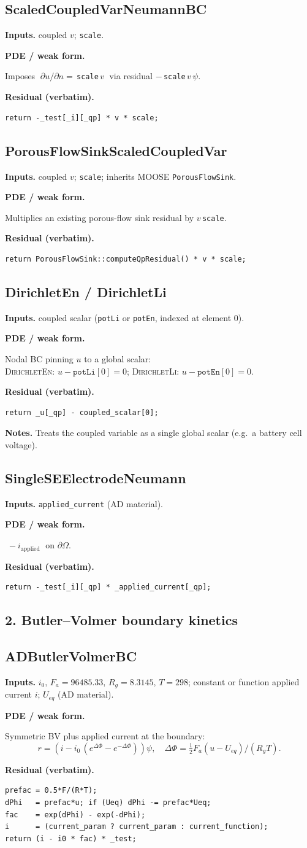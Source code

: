 \documentclass[11pt]{article}
\newcommand{\F}{F_{\!a}}            %
\newcommand{\Rg}{R_{\!g}}           %
\newenvironment{ecmEntry}[1]{%
  \subsection{#1}%
}{}
\newcommand{\inputsRow}[1]{\par\noindent\textbf{Inputs.} #1\par}
\newcommand{\pdeRow}[1]{\par\noindent\textbf{PDE / weak form.}\par #1\par}
\newcommand{\codeRow}{\par\noindent\textbf{Residual (verbatim).}\par}
\newcommand{\notesRow}[1]{\par\noindent\textbf{Notes.} #1\par}
\begin{document}
\begin{ecmEntry}{ScaledCoupledVarNeumannBC}
\inputsRow{coupled $v$; \texttt{scale}.}
\pdeRow{Imposes $\;\partial u/\partial n = $\,\texttt{scale}$\,v\;$ via residual
$-$\,\texttt{scale}$\,v\,\psi$.}
\codeRow\begin{lstlisting}
return -_test[_i][_qp] * v * scale;
\end{lstlisting}
\end{ecmEntry}

\begin{ecmEntry}{PorousFlowSinkScaledCoupledVar}
\inputsRow{coupled $v$; \texttt{scale}; inherits MOOSE \texttt{PorousFlowSink}.}
\pdeRow{Multiplies an existing porous-flow sink residual by $v\,$\texttt{scale}.}
\codeRow\begin{lstlisting}
return PorousFlowSink::computeQpResidual() * v * scale;
\end{lstlisting}
\end{ecmEntry}

\begin{ecmEntry}{DirichletEn / DirichletLi}
\inputsRow{coupled scalar (\texttt{potLi} or \texttt{potEn}, indexed at element 0).}
\pdeRow{Nodal BC pinning $u$ to a global scalar:\\
\textsc{DirichletEn}: $u - \texttt{potLi}[0]=0$;\quad
\textsc{DirichletLi}: $u - \texttt{potEn}[0]=0$.}
\codeRow\begin{lstlisting}
return _u[_qp] - coupled_scalar[0];
\end{lstlisting}
\notesRow{Treats the coupled variable as a single global scalar (e.g.\ a battery cell
voltage).}
\end{ecmEntry}

\begin{ecmEntry}{SingleSEElectrodeNeumann}
\inputsRow{\texttt{applied\_current} (AD material).}
\pdeRow{$\;-i_{\text{applied}}\;$ on $\partial\Omega$.}
\codeRow\begin{lstlisting}
return -_test[_i][_qp] * _applied_current[_qp];
\end{lstlisting}
\end{ecmEntry}

\subsection*{2. Butler--Volmer boundary kinetics}

\begin{ecmEntry}{ADButlerVolmerBC}
\inputsRow{$i_0,\,\F=96485.33,\,\Rg=8.3145,\,T=298$; constant or function applied current
$i$; $U_{eq}$ (AD material).}
\pdeRow{Symmetric BV plus applied current at the boundary:
\[
  r = (i - i_0\,(e^{\Delta\Phi} - e^{-\Delta\Phi}))\psi,\quad
  \Delta\Phi = \tfrac{1}{2}\F(u-U_{eq})/(\Rg T).
\]}
\codeRow\begin{lstlisting}
prefac = 0.5*F/(R*T);
dPhi   = prefac*u; if (Ueq) dPhi -= prefac*Ueq;
fac    = exp(dPhi) - exp(-dPhi);
i      = (current_param ? current_param : current_function);
return (i - i0 * fac) * _test;
\end{lstlisting}
\end{ecmEntry}
\end{document}
